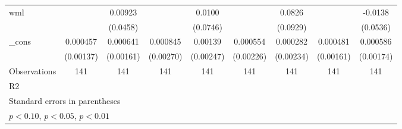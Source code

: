 \begin{table}[htbp]
\begin{tabular}{l*{8}{c}}
wml                 &                     &     0.00923         &                     &      0.0100         &                     &      0.0826         &                     &     -0.0138         \\
                    &                     &    (0.0458)         &                     &    (0.0746)         &                     &    (0.0929)         &                     &    (0.0536)         \\
\_cons              &    0.000457         &    0.000641         &    0.000845         &     0.00139         &    0.000554         &    0.000282         &    0.000481         &    0.000586         \\
                    &   (0.00137)         &   (0.00161)         &   (0.00270)         &   (0.00247)         &   (0.00226)         &   (0.00234)         &   (0.00161)         &   (0.00174)         \\
\hline
Observations        &         141         &         141         &         141         &         141         &         141         &         141         &         141         &         141         \\
R2                  &                     &                     &                     &                     &                     &                     &                     &                     \\
\hline\hline
\multicolumn{9}{l}{\footnotesize Standard errors in parentheses}\\
\multicolumn{9}{l}{\footnotesize \sym{*} \(p<0.10\), \sym{**} \(p<0.05\), \sym{***} \(p<0.01\)}\\
\end{tabular}
\end{table}
